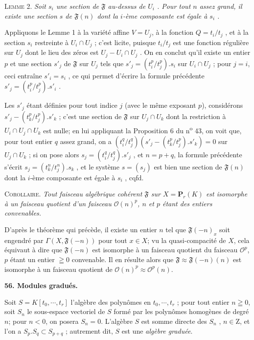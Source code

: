 \textsc{Lemme} 2. \textit{Soit $s_i$ une section de $\mathfrak{F}$ au-dessus de $U_i$ . Pour tout $n$ assez grand, il existe une section $s$ de $\mathfrak{F}(n)$ dont la $i$-ème composante est égale à $s_i$ .}

Appliquons le Lemme 1 à la variété affine $V = U_j$, à la fonction $Q = t_i/t_j$ , et à la section $s_i$ restreinte à $U_i \cap U_j$ ; c'est licite, puisque $t_i/t_j$ est une fonction régulière sur $U_j$ dont le lieu des zéros est $U_j - U_i \cap U_j$ . On en conclut qu'il existe un entier $p$ et une section $s'_j$ de $\mathfrak{F}$ sur $U_j$ tels que $s'_j = (t_i^p/t_j^p).s_i$ sur $U_i \cap U_j$ ; pour $j = i$, ceci entraîne $s'_i = s_i$ , ce qui permet d'écrire la formule précédente $s'_j = (t_i^p/t_j^p).s'_i$ .

Les $s'_j$ étant définies pour tout indice $j$ (avec le même exposant $p$), considérons $s'_j - (t_k^p/t_j^p).s'_k$ ; c'est une section de $\mathfrak{F}$ sur $U_j \cap U_k$ dont la restriction à $U_i \cap U_j \cap U_k$ est nulle; en lui appliquant la Proposition 6 du n\textsuperscript{o} 43, on voit que, pour tout entier $q$ assez grand, on a $(t_i^q/t_j^q)(s'_j - (t_k^p/t_j^p).s'_k) = 0$ sur $U_j \cap U_k$ ; si on pose alors $s_j = (t_i^q/t_j^q).s'_j$ , et $n = p + q$, la formule précédente s'écrit $s_j = (t_k^n/t_j^n).s_k$ , et le système $s = (s_j)$ est bien une section de $\mathfrak{F}(n)$ dont la $i$-ème composante est égale à $s_i$ , cqfd.

\textsc{Corollaire}. \textit{Tout faisceau algébrique cohérent $\mathfrak{F}$ sur $X = \mathbf{P}_r(K)$ est isomorphe à un faisceau quotient d'un faisceau $\mathcal{O}(n)^p$, $n$ et $p$ étant des entiers convenables.}

D'après le théorème qui précède, il existe un entier $n$ tel que $\mathfrak{F}(-n)_x$ soit engendré par $\Gamma(X, \mathfrak{F}(-n))$ pour tout $x \in X$; vu la quasi-compacité de $X$, cela équivaut à dire que $\mathfrak{F}(-n)$ est isomorphe à un faisceau quotient du faisceau $\mathcal{O}^p$, $p$ étant un entier $\geqq 0$ convenable. Il en résulte alors que $\mathfrak{F} \approx \mathfrak{F}(-n)(n)$ est isomorphe à un faisceau quotient de $\mathcal{O}(n)^p \approx \mathcal{O}^p(n)$.


\textbf{56. Modules gradués.}

Soit $S = K[t_0 , \cdots , t_r]$ l'algèbre des polynômes en $t_0 , \cdots , t_r$ ; pour tout entier $n \geqq 0$, soit $S_n$ le sous-espace vectoriel de $S$ formé par les polynômes homogènes de degré $n$; pour $n < 0$, on posera $S_n = 0$. L'algèbre $S$ est somme directe des $S_n$ , $n \in \mathrm{Z}$, et l'on a $S_p.S_q \subset S_{p+q}$ ; autrement dit, $S$ est une \textit{algèbre graduée}.

